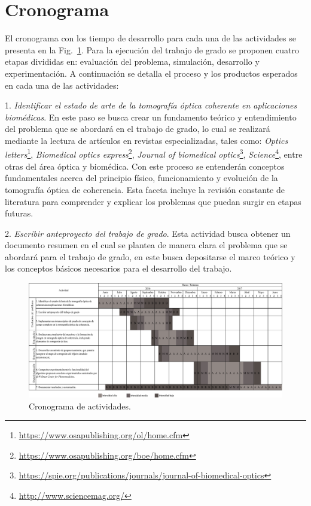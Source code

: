 \section{Cronograma}
\label{sec:cronograma}

El cronograma con los tiempo de desarrollo para cada una de las actividades se presenta en la Fig.~\ref{fig:cronogramalisto}. Para la ejecución del trabajo de grado se proponen cuatro etapas divididas en: evaluación del problema, simulación, desarrollo y experimentación. A continuación se detalla el proceso y los productos esperados en cada una de las actividades:


1. \textit{Identificar el estado de arte de la tomografía óptica coherente en aplicaciones biomédicas}. En este paso se busca crear un fundamento teórico y entendimiento del problema que se abordará en el trabajo de grado, lo cual se realizará mediante la lectura de artículos en revistas especializadas, tales como: \emph{Optics letters}\footnote{\url{https://www.osapublishing.org/ol/home.cfm}}, \emph{Biomedical optics express}\footnote{\url{https://www.osapublishing.org/boe/home.cfm}}, \emph{Journal of biomedical optics}\footnote{\url{https://spie.org/publications/journals/journal-of-biomedical-optics}}, \emph{Science}\footnote{\url{http://www.sciencemag.org/}}, entre otras del área óptica y biomédica. Con este proceso se entenderán conceptos fundamentales acerca del principio físico, funcionamiento y evolución de la tomografía óptica de coherencia. Esta faceta incluye la revisión constante de literatura para comprender y explicar los problemas que puedan surgir en etapas futuras.

2. \textit{Escribir anteproyecto del trabajo de grado}. Esta actividad busca obtener un documento resumen en el cual se plantea de manera clara el problema que se abordará para el trabajo de grado, en este busca depositarse el marco teórico y los conceptos básicos necesarios para el desarrollo del trabajo.


\begin{figure}[H]
	\centering
	\includegraphics[scale=0.5, angle = 90]{Cronograma_listo.pdf}
	\caption[Cronograma de actividades.]{Cronograma de actividades.}
	\label{fig:cronogramalisto}
\end{figure}


